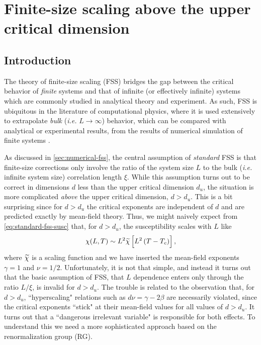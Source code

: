\chapter{Finite-size scaling above the upper critical dimension}
\label{chap:fss}

\section{Introduction}
\label{sec:fss-intro}

The theory of finite-size scaling (FSS) bridges the gap between the critical
behavior of \emph{finite} systems and that of infinite (or effectively
infinite) systems which are commonly studied in analytical theory and
experiment. As such, FSS is ubiquitous in the literature of computational
physics, where it is used extensively to extrapolate \emph{bulk} (\emph{i.e.}
$L\to\infty$) behavior, which can be compared with analytical or experimental
results, from the results of numerical simulation of finite systems
\autocite{binder2001monte}.

As discussed in \cref{sec:numerical-fss}, the central assumption of
\emph{standard} FSS is that finite-size corrections only involve the ratio of
the system size $L$ to the bulk (\emph{i.e.} infinite system size) correlation
length $\xi$.
While this assumption turns out to be correct in dimensions $d$ less than the
upper critical dimension $d_u$, the situation is more complicated \emph{above}
the upper critical dimension, $d>d_u$. This is a bit surprising since for
$d>d_u$ the critical exponents are independent of $d$ and are predicted exactly
by mean-field theory. Thus, we might naively expect from
\cref{eq:standard-fss-susc} that, for $d>d_u$, the susceptibility scales with
$L$ like
\begin{equation}
  \chi(L,T) \sim L^2 \widetilde{\chi}\left[L^2 \left(T-T_c\right)\right],
  \label{eq:fss-above-naive}
\end{equation}
where $\widetilde{\chi}$ is a scaling function and we have inserted the
mean-field exponents $\gamma=1$ and $\nu=1/2$. Unfortunately, it is not that
simple, and instead it turns out that the basic assumption of FSS, that $L$
dependence enters only through the ratio $L/\xi$, is invalid for $d>d_u$. The
trouble is related to the observation that, for $d>d_u$, ``hyperscaling"
relations such as $d \nu = \gamma - 2\beta$ are necessarily violated, since the
critical exponents ``stick" at their mean-field values for all values of
$d>d_u$. It turns out that a ``dangerous irrelevant variable" is responsible
for both effects. To understand this we need a more sophisticated approach
based on the renormalization group (RG).

